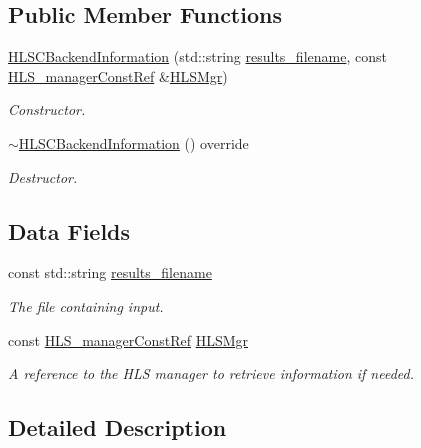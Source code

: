 \subsection*{Public Member Functions}
\begin{DoxyCompactItemize}
\item 
\hyperlink{classHLSCBackendInformation_aa7c6657e78ed9a50ce7f049e3ffd53a6}{H\+L\+S\+C\+Backend\+Information} (std\+::string \hyperlink{classHLSCBackendInformation_a2bbc68445d591f5e04c2a042e9833f5f}{results\+\_\+filename}, const \hyperlink{hls__manager_8hpp_a1b481383e3beabc89bd7562ae672dd8c}{H\+L\+S\+\_\+manager\+Const\+Ref} \&\hyperlink{classHLSCBackendInformation_a840561eb78151f2a6c379d18521b38d1}{H\+L\+S\+Mgr})
\begin{DoxyCompactList}\small\item\em Constructor. \end{DoxyCompactList}\item 
\hyperlink{classHLSCBackendInformation_a074b076db11edaaf4a35fe85bd18e9ee}{$\sim$\+H\+L\+S\+C\+Backend\+Information} () override
\begin{DoxyCompactList}\small\item\em Destructor. \end{DoxyCompactList}\end{DoxyCompactItemize}
\subsection*{Data Fields}
\begin{DoxyCompactItemize}
\item 
const std\+::string \hyperlink{classHLSCBackendInformation_a2bbc68445d591f5e04c2a042e9833f5f}{results\+\_\+filename}
\begin{DoxyCompactList}\small\item\em The file containing input. \end{DoxyCompactList}\item 
const \hyperlink{hls__manager_8hpp_a1b481383e3beabc89bd7562ae672dd8c}{H\+L\+S\+\_\+manager\+Const\+Ref} \hyperlink{classHLSCBackendInformation_a840561eb78151f2a6c379d18521b38d1}{H\+L\+S\+Mgr}
\begin{DoxyCompactList}\small\item\em A reference to the H\+LS manager to retrieve information if needed. \end{DoxyCompactList}\end{DoxyCompactItemize}


\subsection{Detailed Description}


